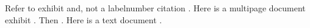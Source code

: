 \documentclass[english]{article}
\begin{document}
Refer to exhibit \cite{image1} and, not a labelnumber citation
\cite{opiniontwombly}.  Here is a multipage document exhibit \cite{doc1}. Then
\cite{image2}. Here is a text document \cite{text1}.

\printbibliography[title={Exhibits},type=exhibit]
\end{document}
